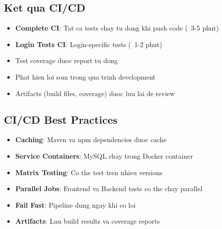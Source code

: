 \subsection{Ket qua CI/CD}

\begin{itemize}
    \item \textbf{Complete CI}: Tat ca tests chay tu dong khi push code (~3-5 phut)
    \item \textbf{Login Tests CI}: Login-specific tests (~1-2 phut)
    \item Test coverage duoc report tu dong
    \item Phat hien loi som trong qua trinh development
    \item Artifacts (build files, coverage) duoc luu lai de review
\end{itemize}

\subsection{CI/CD Best Practices}

\begin{itemize}
    \item \textbf{Caching}: Maven va npm dependencies duoc cache
    \item \textbf{Service Containers}: MySQL chay trong Docker container
    \item \textbf{Matrix Testing}: Co the test tren nhieu versions
    \item \textbf{Parallel Jobs}: Frontend va Backend tests co the chay parallel
    \item \textbf{Fail Fast}: Pipeline dung ngay khi co loi
    \item \textbf{Artifacts}: Luu build results va coverage reports
\end{itemize}
